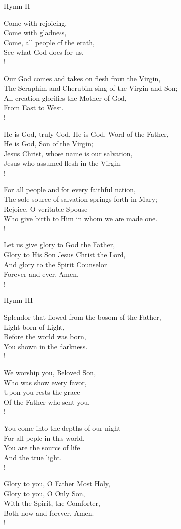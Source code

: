 Hymn II
\begin{cverse}
Come with rejoicing,\\
Come with gladness,\\
Come, all people of the erath,\\
See what God does for us.\\!

Our God comes and takes on flesh from the Virgin,\\
The Seraphim and Cherubim sing of the Virgin and Son;\\
All creation glorifies the Mother of God,\\
From East to West.\\!

He is God, truly  God, He is God, Word of the Father,\\
He is God, Son of the Virgin;\\
Jesus Christ, whose name is our salvation,\\
Jesus who assumed flesh in the Virgin.\\!

For all people and for every faithful nation,\\
The sole source of salvation springs forth in Mary;\\
Rejoice, O veritable Spouse\\
Who give birth to Him in whom we are made one.\\!

Let us give glory to God the Father,\\
Glory to His Son Jesus Christ the Lord,\\
And glory to the Spirit Counselor\\
Forever and ever. Amen.\\!
\end{cverse}

Hymn III
\begin{cverse}
Splendor that flowed from the bosom of the Father,\\
Light born of Light,\\
Before the world was born,\\
You shown in the darkness.\\!

We worship you, Beloved Son,\\
Who was show every favor,\\
Upon you rests the grace\\
Of the Father who sent you.\\!

You come into the depths of our night\\
For all peple in this world,\\
You are the source of life\\
And the true light.\\!

Glory to you, O Father Most Holy,\\
Glory to you, O Only Son,\\
With the Spirit, the Comforter,\\
Both now and forever. Amen.\\!
\end{cverse}

